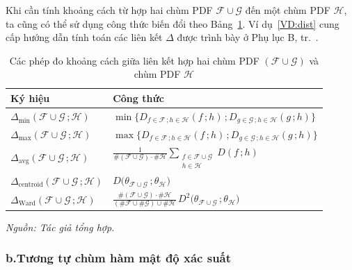 \documentclass[a4paper,oneside]{book} %
\theoremstyle{plain}
\theoremstyle{plain}
\theoremstyle{nonumberplain}
\begin{document}
Khi cần tính khoảng cách từ hợp hai chùm PDF $\mathcal{F}\cup\mathcal{G}$ đến một chùm PDF $\mathcal{H}$, ta cũng có thể sử dụng công thức biến đổi theo Bảng~\ref{tab:lienketchum}. Ví dụ~\ref{VD:dist} cung cấp hướng dẫn tính toán các liên kết $\Delta$ được trình bày ở Phụ lục B, tr.~\pageref{phulucB}.

\begin{table}[H]
	\centering
	\fontsize{11pt}{14pt}\selectfont
	\caption{Các phép đo khoảng cách giữa liên kết hợp hai chùm PDF $(\mathcal{F}\cup\mathcal{G})$ và chùm PDF $\mathcal{H}$}\label{tab:lienketchum}
	\begin{tabular*}{\textwidth}{@{\extracolsep\fill}ll@{\extracolsep\fill}}
		\toprule
		\textbf{Ký hiệu} & \textbf{Công thức} \\
		\midrule
		$\Delta_{\min}(\mathcal{F} \cup \mathcal{G}\,; \mathcal{H})$ &
		$\displaystyle \min\big\{D_{f\in\mathcal{F}\,; h\in\mathcal{H}}(f\,; h)\,;D_{g\in\mathcal{G}\,; h\in\mathcal{H}}(g\,; h)\big\}$ \\
		$\Delta_{\max}(\mathcal{F} \cup \mathcal{G}\,; \mathcal{H})$ &
		$\displaystyle \max\big\{D_{f\in\mathcal{F}\,; h\in\mathcal{H}}(f\,; h)\,; D_{g\in\mathcal{G}\,; h\in\mathcal{H}}(g\,; h)\big\}$ \\
		$\Delta_{\mathrm{avg}}(\mathcal{F} \cup \mathcal{G}\,; \mathcal{H})$ &
		$ \frac{1}{\#(\mathcal{F}\cup\mathcal{G}) \cdot \#\mathcal{H}} 
		\sum_{\substack{f \in \mathcal{F} \cup \mathcal{G}\\ h \in \mathcal{H}}} D(f\,; h)$ \\
		$\Delta_{\mathrm{centroid}}(\mathcal{F} \cup \mathcal{G}\,; \mathcal{H})$ &
		$ D\big(\theta_{\mathcal{F} \cup \mathcal{G}}\,; \theta_{\mathcal{H}}\big)$ \\
		$\Delta_{\mathrm{Ward}}(\mathcal{F} \cup \mathcal{G}\,; \mathcal{H})$ &
		$ \frac{\#(\mathcal{F}\cup\mathcal{G})\cdot \#\mathcal{H}}{(\#\mathcal{F}\cup\#\mathcal{G})\cup\#\mathcal{H}}
		\, D^2\big(\theta_{\mathcal{F} \cup \mathcal{G}}\,; \theta_{\mathcal{H}}\big)$ \\
		\bottomrule
	\end{tabular*}
	\begin{minipage}{\textwidth}
		\fontsize{11pt}{14pt}\selectfont\it
		Nguồn: Tác giả tổng hợp.
	\end{minipage}
\end{table}

\subsubsection{b.\quad Tương tự chùm hàm mật độ xác suất}
\end{document}
